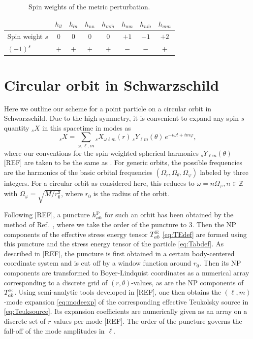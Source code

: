\documentclass[%
reprint,
 prd,
superscriptaddress,
nofootinbib,
aps,
dvipsnames
]{revtex4-2}
\begin{document}
\begin{table}[t]
\caption{Spin weights of the metric perturbation.}
\label{tab:spin-weights-metric}
\begin{ruledtabular}
\begin{tabular}{lccccccc}
  & $h_{ll}$ & $h_{ln}$ & $h_{nn}$ & $h_{m\bar{m}}$
  & $h_{nm}$ & $h_{n\bar{m}}$ & $h_{mm}$ \\
\hline
  Spin weight $s$
    & $0$ & $0$ & $0$ & $0$ & $+1$ & $-1$ & $+2$ \\
  $(-1)^{s}$
    & $+$ & $+$ & $+$ & $+$ & $-$  & $-$  & $+$  \\
\end{tabular}
\end{ruledtabular}
\end{table}


\section{Circular orbit in Schwarzschild}
\label{sec:schw}

Here we outline our scheme for a point particle on a circular orbit in Schwarzschild. Due to the high symmetry, it is convenient to expand any spin-$s$ quantity ${}_s X$ in this spacetime in modes as 
\begin{equation}
\label{eq:modeexp}
    {}_s X = \sum_{\omega,\ell,m}  {}_s X_{\omega \ell m}(r) \, {}_s Y_{\ell m}(\theta) \,  e^{-i\omega t+im\varphi}, 
\end{equation}
where our conventions for the spin-weighted spherical harmonics ${}_s Y_{\ell m}(\theta)$ [REF] are taken to be the same as \cite{Hollands:2024iqp}. For generic orbits, the possible frequencies are the harmonics of the basic orbital frequencies $(\Omega_r, \Omega_\theta, \Omega_\varphi)$ labeled by three integers. For a circular orbit as considered here, this reduces to $\omega=n\Omega_\varphi, n \in {\mathbb Z}$ with $\Omega_\varphi = \sqrt{M/r_0^3}$, where $r_0$ is the radius of the orbit.

Following [REF], a puncture $h^{\rm P}_{ab}$ for such an orbit has been obtained by the method of Ref.~\cite{Bourg:2024cgh}, where we take the order of the puncture to $3$. Then the NP components of the effective stress energy tensor $T^{\rm E}_{ab}$ \eqref{eq:TEdef} are formed using this puncture and the 
stress energy tensor of the particle \eqref{eq:Tabdef}. 
As described in [REF], the puncture is first obtained in a certain body-centered coordinate system and is cut off by a window function around $r_0$. Then its NP components are transformed to Boyer-Lindquist coordinates as a numerical array corresponding to a discrete grid of $(r,\theta)$-values, as are the NP components of 
$T^{\rm E}_{ab}$. Using semi-analytic tools developed in [REF], one then obtains the $(\ell,m)$-mode expansion \eqref{eq:modeexp} of the corresponding effective Teukolsky source in \eqref{eq:Teuksource}. Its expansion coefficients are numerically given as an array on a discrete set of $r$-values per mode [REF]. The order of the puncture governs the fall-off of the mode amplitudes in $\ell$.
\end{document}
